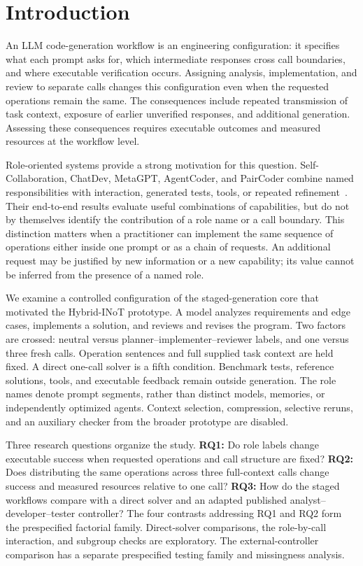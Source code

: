 \section{Introduction}
An LLM code-generation workflow is an engineering configuration: it specifies what each prompt asks for, which intermediate responses cross call boundaries, and where executable verification occurs. Assigning analysis, implementation, and review to separate calls changes this configuration even when the requested operations remain the same. The consequences include repeated transmission of task context, exposure of earlier unverified responses, and additional generation. Assessing these consequences requires executable outcomes and measured resources at the workflow level.

Role-oriented systems provide a strong motivation for this question. Self-Collaboration, ChatDev, MetaGPT, AgentCoder, and PairCoder combine named responsibilities with interaction, generated tests, tools, or repeated refinement~\citep{dong2023selfcollaboration,qian2024chatdev,hong2024metagpt,huang2023agentcoder,zhang2024paircoder}. Their end-to-end results evaluate useful combinations of capabilities, but do not by themselves identify the contribution of a role name or a call boundary. This distinction matters when a practitioner can implement the same sequence of operations either inside one prompt or as a chain of requests. An additional request may be justified by new information or a new capability; its value cannot be inferred from the presence of a named role.

We examine a controlled configuration of the staged-generation core that motivated the Hybrid-INoT prototype. A model analyzes requirements and edge cases, implements a solution, and reviews and revises the program. Two factors are crossed: neutral versus planner--implementer--reviewer labels, and one versus three fresh calls. Operation sentences and full supplied task context are held fixed. A direct one-call solver is a fifth condition. Benchmark tests, reference solutions, tools, and executable feedback remain outside generation. The role names denote prompt segments, rather than distinct models, memories, or independently optimized agents. Context selection, compression, selective reruns, and an auxiliary checker from the broader prototype are disabled.

Three research questions organize the study. \textbf{RQ1:} Do role labels change executable success when requested operations and call structure are fixed? \textbf{RQ2:} Does distributing the same operations across three full-context calls change success and measured resources relative to one call? \textbf{RQ3:} How do the staged workflows compare with a direct solver and an adapted published analyst--developer--tester controller? The four contrasts addressing RQ1 and RQ2 form the prespecified factorial family. Direct-solver comparisons, the role-by-call interaction, and subgroup checks are exploratory. The external-controller comparison has a separate prespecified testing family and missingness analysis.

